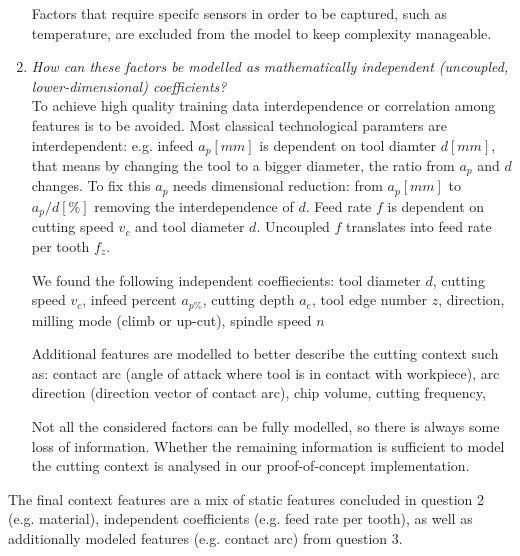 \documentclass[5p,times,procedia]{elsarticle}
\begin{document}
\begin{enumerate}
	Factors that require specifc sensors in order to be captured, such as temperature, are excluded from the model to keep complexity manageable.
	
	\vspace*{.5\baselineskip}
	\item\label{Q3} \textit{How can these factors be modelled as mathematically independent (uncoupled, lower-dimensional) coefficients?}\\
	To achieve high quality training data interdependence or correlation among features is to be avoided.
	Most classical technological paramters are interdependent: e.g. infeed $a_p [mm]$ is dependent on tool diamter $d [mm]$, that means by changing the tool to a bigger diameter, the ratio from $a_p$ and $d$ changes. To fix this $a_p$ needs dimensional reduction: from $a_p [mm]$ to $a_p / d [\%]$ removing the interdependence of $d$. Feed rate $f$ is dependent on cutting speed $v_c$ and tool diameter $d$. Uncoupled $f$ translates into feed rate per tooth $f_z$.
	
	We found the following independent coeffiecients:
	tool diameter $d$, cutting speed $v_c$, infeed percent $a_{p\%}$, cutting depth $a_e$, tool edge number $z$, direction, milling mode (climb or up-cut), spindle speed $n$
		
	Additional features are modelled to better describe the cutting context such as: contact arc (angle of attack where tool is in contact with workpiece), arc direction (direction vector of contact arc), chip volume, cutting frequency, 
	
	Not all the considered factors can be fully modelled, so there is always some loss of information.
	Whether the remaining information is sufficient to model the cutting context is analysed in our proof-of-concept implementation.
\end{enumerate}

The final context features are a mix of static features concluded in question 2 (e.g. material), independent coefficients (e.g. feed rate per tooth), as well as additionally modeled features (e.g. contact arc) from question 3.
\end{document}
